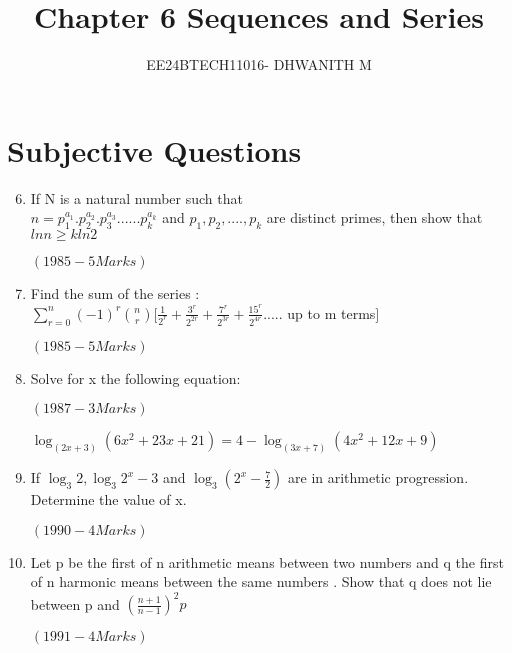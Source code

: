 \documentclass[journal,12pt,twocolumn]{IEEEtran}
\theoremstyle{remark}
\begin{document}

\vspace{3cm}

\title{Chapter 6 Sequences and Series}
\author{EE24BTECH11016- DHWANITH M}
\maketitle
\newpage
\bigskip

\renewcommand{\thefigure}{\theenumi}
\renewcommand{\thetable}{\theenumi}

\section*{Subjective Questions}
\begin{enumerate}
    \setcounter{enumi}{5}
    \item If N is a natural number such that
\\ 
$n= p_{1}^{a_1}.p_{2}^{a_2}.p_{3}^{a_3}......p_{k}^{a_k} $ and $ p_1,p_2,....,p_k $ are distinct primes, then show that $ ln n \geq k ln2 $  \begin{flushright}                                      $( 1985-5 Marks )$                      \end{flushright} 


    \item Find the sum of the series : \\          $\sum_{r=0}^{n} (-1)^r \binom{n}{r}[\frac{1}{2^r}+\frac{3^r}{2^{2r}}+\frac{7^r}{2^{3r}}+\frac{15^r}{2^{4r}}.....$ up to m terms$ ] $ \\ 
	    \begin{flushright}
		    $( 1985-5 Marks )$
	    \end{flushright}
     \item Solve for x the following equation: \begin{flushright}                                      $( 1987-3 Marks )$                     \end{flushright}  
		     $   \log_{(2x+3)}{(6x^2+23x+21)}=4-\log_{(3x+7)}{(4x^2+12x+9)} $

      \item If $ \log_{3}{2},\log_{3}{2^x-3} $ and $ \log_{3}{(2^x-\frac{7}{2})} $ are in arithmetic progression. Determine the value of x. 
     \begin{flushright}
      $(1990 -4 Marks)$
      \end{flushright}

      \item Let p be the first of n arithmetic means between two numbers and q the first of n harmonic means between the same numbers . Show that q does not lie between p and $(\frac{n+1}{n-1})^2p$ 
       \begin{flushright}
      $(1991 -4 Marks)$
      \end{flushright}


\end{enumerate}
\end{document}
